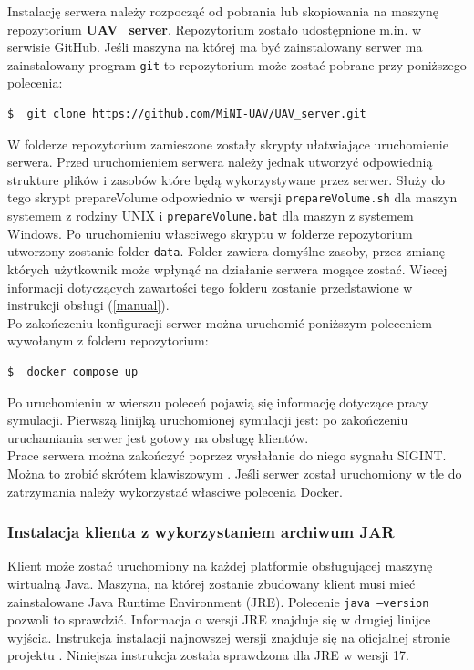 \documentclass[15pt]{sprawozdanie}
\begin{document}
Instalację serwera należy rozpocząć od pobrania lub skopiowania na maszynę repozytorium \textbf{UAV\_server}. Repozytorium zostało udostępnione m.in. w serwisie GitHub. Jeśli maszyna na której ma być zainstalowany serwer ma zainstalowany program \texttt{git} to repozytorium może zostać pobrane przy poniższego polecenia:
\begin{lstlisting}[language=bash]
  $  git clone https://github.com/MiNI-UAV/UAV_server.git
\end{lstlisting}

W folderze repozytorium zamieszone zostały skrypty ułatwiające uruchomienie serwera. Przed uruchomieniem serwera należy jednak utworzyć odpowiednią strukture plików i zasobów które będą wykorzystywane przez serwer. Służy do tego skrypt prepareVolume odpowiednio w wersji  \texttt{prepareVolume.sh} dla maszyn systemem z rodziny UNIX i  \texttt{prepareVolume.bat} dla maszyn z systemem Windows. Po uruchomieniu własciwego skryptu w folderze repozytorium utworzony zostanie folder \texttt{data}. Folder zawiera domyślne zasoby, przez zmianę których użytkownik może wpłynąć na działanie serwera mogące zostać.  Wiecej informacji dotyczących zawartości tego folderu zostanie przedstawione w instrukcji obsługi (\ref{manual}).\\

Po zakończeniu konfiguracji serwer można uruchomić poniższym poleceniem wywołanym z folderu repozytorium:
\begin{lstlisting}[language=bash]
  $  docker compose up
\end{lstlisting}
Po uruchomieniu w wierszu poleceń pojawią się informację dotyczące pracy symulacji. Pierwszą linijką uruchomionej symulacji jest: po zakończeniu uruchamiania serwer jest gotowy na obsługę klientów.\\

Prace serwera można zakończyć poprzez wysłałanie do niego sygnału SIGINT. Można to zrobić skrótem klawiszowym . Jeśli serwer został uruchomiony w tle do zatrzymania należy wykorzystać własciwe polecenia Docker.

\subsubsection{Instalacja klienta z wykorzystaniem archiwum JAR}
\label{javaInst}

Klient może zostać uruchomiony na każdej platformie obsługującej maszynę wirtualną Java. 
Maszyna, na której zostanie zbudowany klient musi mieć zainstalowane Java Runtime Environment (JRE). Polecenie \texttt{java --version} pozwoli to sprawdzić. Informacja o wersji JRE znajduje się w drugiej linijce wyjścia. Instrukcja instalacji najnowszej wersji znajduje się na oficjalnej stronie projektu \cite{java}. Niniejsza instrukcja została sprawdzona dla JRE w wersji 17. \\
\end{document}
